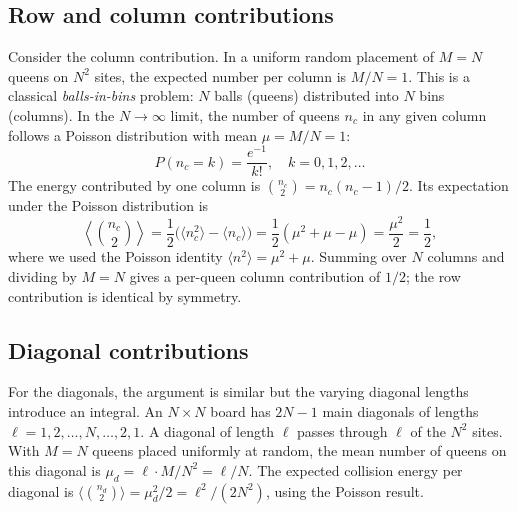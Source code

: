 \documentclass[aps, pre, reprint, amsmath, amssymb, superscriptaddress, floatfix]{revtex4-2}
\begin{document}
\subsection{Row and column contributions}

Consider the column contribution.  In a uniform random placement of
$M = N$ queens on $N^2$ sites, the expected number per column is
$M/N = 1$.  This is a classical \textit{balls-in-bins} problem:
$N$ balls (queens) distributed into $N$ bins (columns).  In the $N \to \infty$ limit,
the number of queens $n_c$ in any given column follows a Poisson
distribution with mean $\mu = M/N = 1$:
\begin{equation}
  P(n_c = k) = \frac{e^{-1}}{k!}, \quad k = 0, 1, 2, \ldots
  \label{eq:Poisson_col}
\end{equation}
The energy contributed by one column is $\binom{n_c}{2} =
n_c(n_c - 1)/2$.  Its expectation under the Poisson distribution is
\begin{equation}
  \left\langle \binom{n_c}{2} \right\rangle
  = \frac{1}{2}\bigl(\langle n_c^2 \rangle - \langle n_c \rangle\bigr)
  = \frac{1}{2}(\mu^2 + \mu - \mu) = \frac{\mu^2}{2} = \frac{1}{2},
  \label{eq:col_energy}
\end{equation}
where we used the Poisson identity $\langle n^2 \rangle = \mu^2 +
\mu$.  Summing over $N$ columns and dividing by $M = N$ gives a per-queen
column contribution of $1/2$; the row contribution is identical by
symmetry.

\subsection{Diagonal contributions}

For the diagonals, the argument is similar but the varying diagonal
lengths introduce an integral.  An $N \times N$ board has $2N - 1$
main diagonals of lengths $\ell = 1, 2, \ldots, N, \ldots, 2, 1$.
A diagonal of length $\ell$ passes through $\ell$ of the $N^2$ sites.
With $M = N$ queens placed uniformly at random, the mean number of
queens on this diagonal is $\mu_d = \ell \cdot M/N^2 = \ell/N$.
The expected collision energy per diagonal is
$\langle\binom{n_d}{2}\rangle = \mu_d^2/2 = \ell^2/(2N^2)$, using
the Poisson result.
\end{document}

